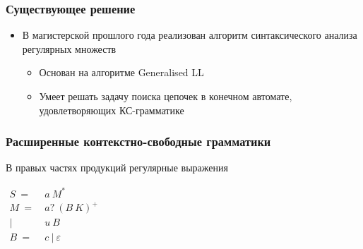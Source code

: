 \documentclass{beamer}
\begin{document}
 \begin{frame}
     \frametitle{Существующее решение}
     \begin{itemize}
         \item В магистерской прошлого года реализован алгоритм синтаксического анализа регулярных множеств
         \begin{itemize}
            \item Основан на алгоритме Generalised LL
            \item Умеет решать задачу поиска цепочек в конечном автомате, удовлетворяющих КС-грамматике
         \end{itemize}
         
     \end{itemize}
 \end{frame}
	\begin{frame} 
		\frametitle{Расширенные контекстно-свободные грамматики}
		\begin{center}
		В правых частях продукций регулярные выражения
		\end{center}
		\begin{center}
			{$\begin{aligned}
				S\ =&\ a\ M^* \\
				M\ =&\ a?\ (B\ K)^+ \\
				|&\ u\ B \\
				B\ =&\ c\ |\ \varepsilon
				\end{aligned}$}
		\end{center}
	\end{frame}
	
\end{document}
